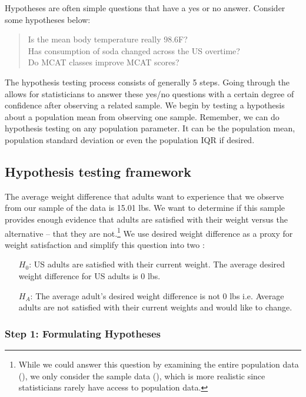Hypotheses are often simple questions that have a yes or no answer. Consider some hypotheses below: \begin{quote}
Is the mean body temperature really 98.6F? \\
Has consumption of soda changed across the US overtime? \\
Do MCAT classes improve MCAT scores? 
\end{quote}

The hypothesis testing process consists of generally 5 steps. Going through the  allows for statisticians to answer these yes/no questions with a certain degree of confidence after observing a related sample. We begin by testing a hypothesis about a population mean from observing one sample. Remember, we can do hypothesis testing on any population parameter. It can be the population mean, population standard deviation or even the population IQR if desired. 

\subsection{Hypothesis testing framework}
\label{hypothesisFramework}

The average weight difference that adults want to experience that we observe from our sample of the  data is 15.01 lbs. We want to determine if this sample provides enough evidence that adults are satisfied with their weight versus the alternative -- that they are not.\footnote{While we could answer this question by examining the entire population data (), we only consider the sample data (), which is more realistic since statisticians rarely have access to population data.} We use desired weight difference as a proxy for weight satisfaction and simplify this question into two : 
\begin{itemize}
\setlength{\itemsep}{0mm}
\item[$H_0$:] US adults are satisfied with their current weight. The average desired weight difference for US adults is 0 lbs. 
\item[$H_A$:] The average adult's desired weight difference is not 0 lbs i.e. Average adults are not satisfied with their current weights and would like to change. 
\end{itemize}

\subsubsection{Step 1: Formulating Hypotheses}

